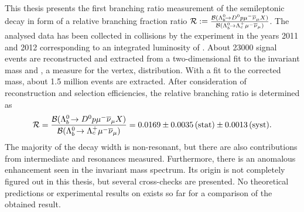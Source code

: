 This thesis presents the first branching ratio measurement of the semileptonic decay \LbToDpmunuX in form of a relative branching fraction ratio $\mathcal{R} := \frac{{\cal B}({{\Lambda}^0_{b}}\!\rightarrow {\ensuremath{{D}^0}}{\ensuremath{p}}{\ensuremath{\mu^-}}{\ensuremath{{\overline{\nu}}_\mu}} X)}{{\cal B}({{\Lambda}^0_{b}}\!\rightarrow {\ensuremath{{\Lambda}^+_{c}}}{\ensuremath{\mu^-}}{\ensuremath{{\overline{\nu}}_\mu}})}$.
The analysed data has been collected in \proton\proton collisions by the \lhcb experiment in the years 2011 and 2012 corresponding to an integrated luminosity of \intlum{3\invfb}.
About 23000 \LbToDpmunu signal events are reconstructed and extracted from a two-dimensional fit to the invariant \Dz\proton mass and \logIP, a measure for the \Dz\proton\mun vertex, distribution.
With a fit to the corrected \Lb mass, about 1.5 million \LbToLcmunu events are extracted.
After consideration of reconstruction and selection efficiencies, the relative branching ratio \R is determined as
\begin{align*}
    \mathcal{R} = \frac{{\cal B}({{\Lambda}^0_{b}}\!\rightarrow {\ensuremath{{D}^0}}{\ensuremath{p}}{\ensuremath{\mu^-}}{\ensuremath{{\overline{\nu}}_\mu}} X)}{{\cal B}({{\Lambda}^0_{b}}\!\rightarrow {\ensuremath{{\Lambda}^+_{c}}}{\ensuremath{\mu^-}}{\ensuremath{{\overline{\nu}}_\mu}})} = 0.0169 \pm 0.0035\mathrm{\,(stat)} \pm 0.0013\mathrm{\,(syst)}.
\end{align*}
The majority of the \LbToDpmunuX decay width is non-resonant, but there are also contributions from intermediate \LcResI and \LcResII resonances measured.
Furthermore, there is an anomalous enhancement seen in the invariant \Dz\proton mass spectrum.
Its origin is not completely figured out in this thesis, but several cross-checks are presented.
No theoretical predictions or experimental results on \R exists so far for a comparison of the obtained result.
